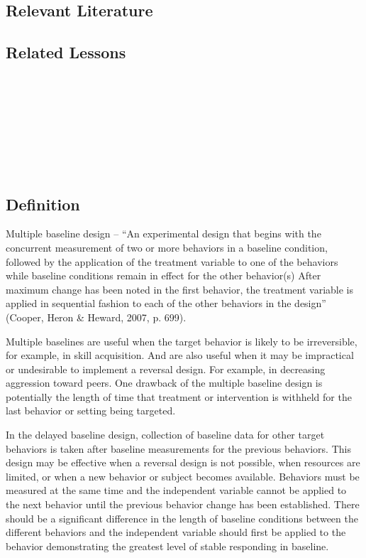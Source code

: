 \subsection{Relevant Literature}
\begin{refsection}
\nocite{cooper2007applied,
    hartmann1976changing,
    mcdougall2005range,
    mclaughlin1983examination,
    hall1977changing,
    allen2001exposure}
\printbibliography[heading=none]
\end{refsection}
%
\subsection{Related Lessons}
\fourbFour{}\\
\fourbFive{}\\
\fourbSeven{}\\
\fourbNine{}\\
\fourbEleven{}\\ 
\fourhFour{}\\
\fouriOne{}\\
%
\subsection{Definition}
Multiple baseline design – ``An experimental design that begins with the concurrent measurement of two or more behaviors in a baseline condition, followed by the application of the treatment variable to one of the behaviors while baseline conditions remain in effect for the other behavior(s) After maximum change has been noted in the first behavior, the treatment variable is applied in sequential fashion to each of the other behaviors in the design'' (Cooper, Heron \& Heward, 2007, p. 699).

Multiple baselines are useful when the target behavior is likely to be irreversible, for example, in skill acquisition. And are also useful when it may be impractical or undesirable to implement a reversal design. For example, in decreasing aggression toward peers. One drawback of the multiple baseline design is potentially the length of time that treatment or intervention is withheld for the last behavior or setting being targeted. 

In the delayed baseline design, collection of baseline data for other target behaviors is taken after baseline measurements for the previous behaviors. This design may be effective when a reversal design is not possible, when resources are limited, or when a new behavior or subject becomes available. Behaviors must be measured at the same time and the independent variable cannot be applied to the next behavior until the previous behavior change has been established. There should be a significant difference in the length of baseline conditions between the different behaviors and the independent variable should first be applied to the behavior demonstrating the greatest level of stable responding in baseline.

